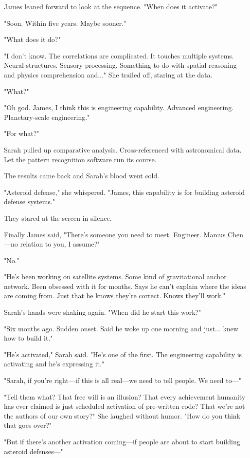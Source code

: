James leaned forward to look at the sequence. "When does it activate?"

"Soon. Within five years. Maybe sooner."

"What does it do?"

"I don't know. The correlations are complicated. It touches multiple systems. Neural structures. Sensory processing. Something to do with spatial reasoning and physics comprehension and..." She trailed off, staring at the data.

"What?"

"Oh god. James, I think this is engineering capability. Advanced engineering. Planetary-scale engineering."

"For what?"

Sarah pulled up comparative analysis. Cross-referenced with astronomical data. Let the pattern recognition software run its course.

The results came back and Sarah's blood went cold.

"Asteroid defense," she whispered. "James, this capability is for building asteroid defense systems."

They stared at the screen in silence.

Finally James said, "There's someone you need to meet. Engineer. Marcus Chen—no relation to you, I assume?"

"No."

"He's been working on satellite systems. Some kind of gravitational anchor network. Been obsessed with it for months. Says he can't explain where the ideas are coming from. Just that he knows they're correct. Knows they'll work."

Sarah's hands were shaking again. "When did he start this work?"

"Six months ago. Sudden onset. Said he woke up one morning and just... knew how to build it."

"He's activated," Sarah said. "He's one of the first. The engineering capability is activating and he's expressing it."

"Sarah, if you're right—if this is all real—we need to tell people. We need to—"

"Tell them what? That free will is an illusion? That every achievement humanity has ever claimed is just scheduled activation of pre-written code? That we're not the authors of our own story?" She laughed without humor. "How do you think that goes over?"

"But if there's another activation coming—if people are about to start building asteroid defenses—"

